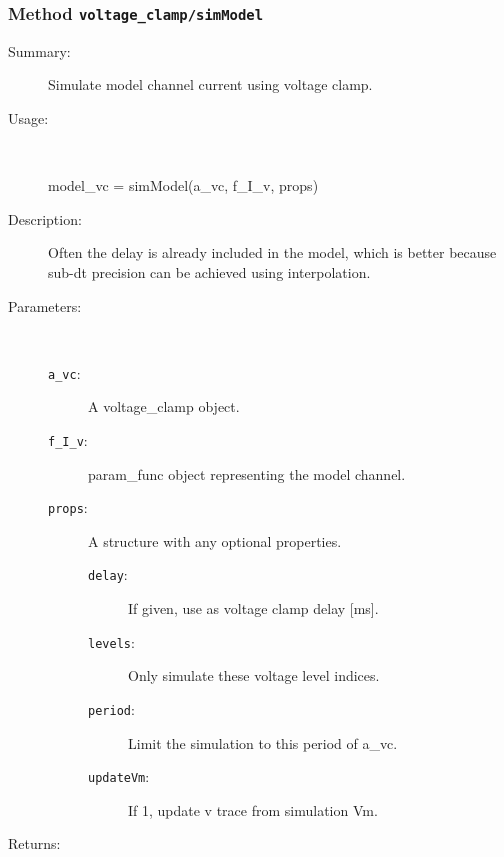 \subsubsection[Method \texttt{simModel}]{Method \texttt{voltage\_clamp/simModel}}%
%
\label{ref_voltage_clamp__simModel}%
\hypertarget{ref_voltage_clamp__simModel}{}%
\begin{description}
\item[Summary:]Simulate model channel current using voltage clamp.
%
\item[Usage:]~%
\begin{lyxcode}%
model\_vc = simModel(a\_vc, f\_I\_v, props)
%
\end{lyxcode}%
%
\item[Description:]%
Often the delay is already included in the model, which is better
 because sub-dt precision can be achieved using interpolation.
\item[Parameters:]~
\begin{description}%
\item[\texttt{a\_vc}:]
 A voltage\_clamp object.
\item[\texttt{f\_I\_v}:]
 param\_func object representing the model channel. 
\item[\texttt{props}:]
 A structure with any optional properties.
\begin{description}%
\item[\texttt{delay}:]
 If given, use as voltage clamp delay [ms].
\item[\texttt{levels}:]
 Only simulate these voltage level indices.
\item[\texttt{period}:]
 Limit the simulation to this period of a\_vc.
\item[\texttt{updateVm}:]
 If 1, update v trace from simulation Vm. 
\end{description}%
\end{description}%
%
\item[Returns:
]~


\end{description}

